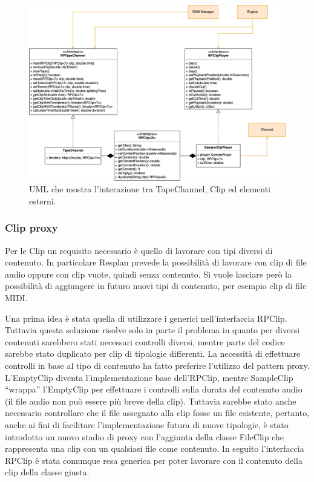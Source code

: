 \documentclass[a4paper,12pt]{report}
\begin{document}
\begin{figure}[H]
\centering{}
\includegraphics[width=\textwidth]{img/tapechannel.png}
\caption{UML che mostra l'interazione tra TapeChannel, Clip ed elementi esterni.}
\end{figure}

\subsubsection{Clip proxy}
Per le Clip un requisito necessario è quello di lavorare con tipi diversi di contenuto. In particolare Resplan prevede la possibilità di lavorare con clip di file audio oppure con clip vuote, quindi senza contenuto. Si vuole lasciare però la possibilità di aggiungere in futuro nuovi tipi di contenuto, per esempio clip di file MIDI.

Una prima idea è stata quella di utilizzare i generici nell’interfaccia RPClip. Tuttavia questa soluzione risolve solo in parte il problema in quanto per diversi contenuti sarebbero stati necessari controlli diversi, mentre parte del codice sarebbe stato duplicato per clip di tipologie differenti.
La necessità di effettuare controlli in base al tipo di contenuto ha fatto preferire l’utilizzo del pattern proxy.
L’EmptyClip diventa l’implementazione base dell’RPClip, mentre SampleClip “wrappa” l’EmptyClip per effettuare i controlli sulla durata del contenuto audio (il file audio non può essere più breve della clip).
Tuttavia sarebbe stato anche necessario controllare che il file assegnato alla clip fosse un file esistente, pertanto, anche ai fini di facilitare l’implementazione futura di nuove tipologie, è stato introdotto un nuovo stadio di proxy con l’aggiunta della classe FileClip che rappresenta una clip con un qualsiasi file come contenuto.
In seguito l’interfaccia RPClip è stata comunque resa generica per poter lavorare con il contenuto della clip della classe giusta.
\endsubsubsection
\end{document}
